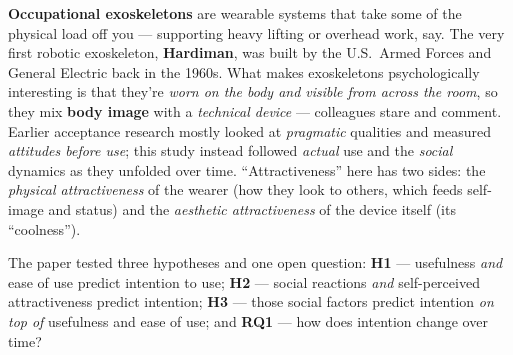\documentclass[11pt, oneside]{book}
\begin{document}
\textbf{Occupational exoskeletons} are wearable systems that take some of the
physical load off you — supporting heavy lifting or overhead work, say. The
very first robotic exoskeleton, \textbf{Hardiman}, was built by the U.S.\ Armed
Forces and General Electric back in the 1960s. What makes exoskeletons
psychologically interesting is that they're \emph{worn on the body and visible
from across the room}, so they mix \textbf{body image} with a \emph{technical
device} — colleagues stare and comment. Earlier acceptance research mostly
looked at \emph{pragmatic} qualities and measured \emph{attitudes before use};
this study instead followed \emph{actual} use and the \emph{social} dynamics as
they unfolded over time. ``Attractiveness'' here has two sides: the
\emph{physical attractiveness} of the wearer (how they look to others, which
feeds self-image and status) and the \emph{aesthetic attractiveness} of the
device itself (its ``coolness'').

The paper tested three hypotheses and one open question: \textbf{H1} —
usefulness \emph{and} ease of use predict intention to use; \textbf{H2} —
social reactions \emph{and} self-perceived attractiveness predict intention;
\textbf{H3} — those social factors predict intention \emph{on top of}
usefulness and ease of use; and \textbf{RQ1} — how does intention change over
time?
\end{document}

